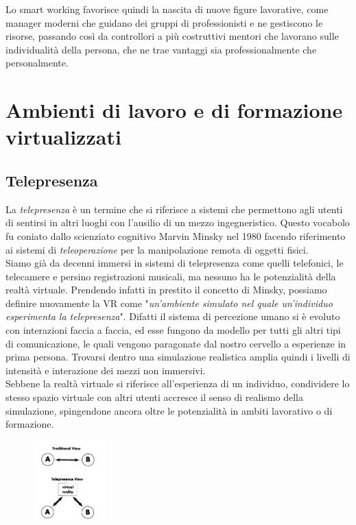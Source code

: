 Lo smart working favorisce quindi la nascita di nuove figure lavorative, come manager moderni che guidano dei gruppi di professionisti e ne gestiscono le risorse, passando così da controllori a più costruttivi mentori che lavorano sulle individualità della persona, che ne trae vantaggi sia professionalmente che personalmente. \\

\section{Ambienti di lavoro e di formazione virtualizzati}
\subsection{Telepresenza}
 La \textit{telepresenza} è un termine che si riferisce a sistemi che permettono agli utenti di sentirsi in altri luoghi con l'ausilio di un mezzo ingegneristico. Questo vocabolo fu coniato dallo scienziato cognitivo Marvin Minsky nel 1980 facendo riferimento ai sistemi di \textit{teleoperazione} per la manipolazione remota di oggetti fisici.\\
 Siamo già da decenni immersi in sistemi di telepresenza come quelli telefonici, le telecamere e persino registrazioni musicali, ma nessuno ha le potenzialità della realtà virtuale. Prendendo infatti in prestito il concetto di Minsky, possiamo definire nuovamente la VR come "\textit{un'ambiente simulato nel quale un'individuo esperimenta la telepresenza}"\cite{DVR}. Difatti il sistema di percezione umano si è evoluto con interazioni faccia a faccia, ed esse fungono da modello per tutti gli altri tipi di comunicazione, le quali vengono paragonate dal nostro cervello a esperienze in prima persona. Trovarsi dentro una simulazione realistica amplia quindi i livelli di intensità e interazione dei mezzi non immersivi. \\
 Sebbene la realtà virtuale si riferisce all'esperienza di un individuo, condividere lo stesso spazio virtuale con altri utenti accresce il senso di realismo della simulazione, spingendone ancora oltre le potenzialità in ambiti lavorativo o di formazione.  
   \begin{figure} %
 	\centering
 	\includegraphics[width=0.25\textwidth]{figure/Telepresenza}
 \end{figure}
